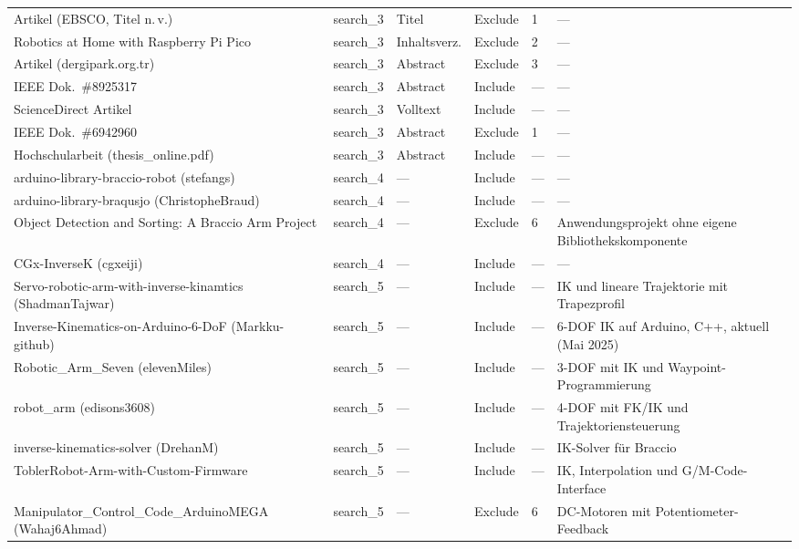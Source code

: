 \documentclass[12pt,a4paper]{article}
\begin{document}
\begin{landscape}
\begin{longtable}{p{5.5cm} l l l l p{5.5cm}}
Artikel (EBSCO, Titel n.\,v.)
  & search\_3 & Titel & Exclude & 1 & — \\
\addlinespace
Robotics at Home with Raspberry Pi Pico
  & search\_3 & Inhaltsverz. & Exclude & 2 & — \\
\addlinespace
Artikel (dergipark.org.tr)
  & search\_3 & Abstract & Exclude & 3 & — \\
\addlinespace
IEEE Dok.\ \#8925317
  & search\_3 & Abstract & Include & — & — \\
\addlinespace
ScienceDirect Artikel
  & search\_3 & Volltext & Include & — & — \\
\addlinespace
IEEE Dok.\ \#6942960
  & search\_3 & Abstract & Exclude & 1 & — \\
\addlinespace
Hochschularbeit (thesis\_online.pdf)
  & search\_3 & Abstract & Include & — & — \\
\addlinespace
arduino-library-braccio-robot (stefangs)
  & search\_4 & — & Include & — & — \\
\addlinespace
arduino-library-braqusjo (ChristopheBraud)
  & search\_4 & — & Include & — & — \\
\addlinespace
Object Detection and Sorting: A Braccio Arm Project
  & search\_4 & — & Exclude & 6 & Anwendungsprojekt ohne eigene Bibliothekskomponente \\
\addlinespace
CGx-InverseK (cgxeiji)
  & search\_4 & — & Include & — & — \\
\addlinespace
Servo-robotic-arm-with-inverse-kinamtics (ShadmanTajwar)
  & search\_5 & — & Include & — & IK und lineare Trajektorie mit Trapezprofil \\
\addlinespace
Inverse-Kinematics-on-Arduino-6-DoF (Markku-github)
  & search\_5 & — & Include & — & 6-DOF IK auf Arduino, C++, aktuell (Mai 2025) \\
\addlinespace
Robotic\_Arm\_Seven (elevenMiles)
  & search\_5 & — & Include & — & 3-DOF mit IK und Waypoint-Programmierung \\
\addlinespace
robot\_arm (edisons3608)
  & search\_5 & — & Include & — & 4-DOF mit FK/IK und Trajektoriensteuerung \\
\addlinespace
inverse-kinematics-solver (DrehanM)
  & search\_5 & — & Include & — & IK-Solver für Braccio \\
\addlinespace
ToblerRobot-Arm-with-Custom-Firmware
  & search\_5 & — & Include & — & IK, Interpolation und G/M-Code-Interface \\
\addlinespace
Manipulator\_Control\_Code\_ArduinoMEGA (Wahaj6Ahmad)
  & search\_5 & — & Exclude & 6 & DC-Motoren mit Potentiometer-Feedback \\

\end{longtable}
\end{landscape}
\end{document}
